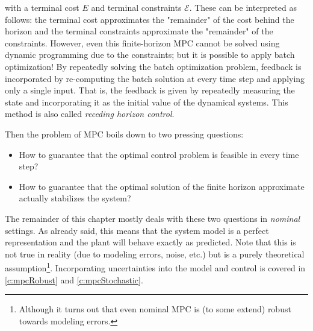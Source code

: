 	with a terminal cost \(E\) and terminal constraints \(\mathcal{E}\). These can be interpreted as follows: the terminal cost approximates the "remainder" of the cost behind the horizon and the terminal constraints approximate the "remainder" of the constraints. However, even this finite-horizon MPC cannot be solved using dynamic programming due to the constraints; but it is possible to apply batch optimization! By repeatedly solving the batch optimization problem, feedback is incorporated by re-computing the batch solution at every time step and applying only a single input. That is, the feedback is given by repeatedly measuring the state and incorporating it as the initial value of the dynamical systems. This method is also called \emph{receding horizon control}.

	Then the problem of MPC boils down to two pressing questions:
	\begin{itemize}
		\item How to guarantee that the optimal control problem is feasible in every time step?
		\item How to guarantee that the optimal solution of the finite horizon approximate actually stabilizes the system?
	\end{itemize}
	The remainder of this chapter mostly deals with these two questions in \emph{nominal} settings. As already said, this means that the system model is a perfect representation and the plant will behave exactly as predicted. Note that this is not true in reality (due to modeling errors, noise, etc.) but is a purely theoretical assumption\footnote{Although it turns out that even nominal MPC is (to some extend) robust towards modeling errors.}. Incorporating uncertainties into the model and control is covered in \autoref{c:mpcRobust} and \ref{c:mpcStochastic}.

